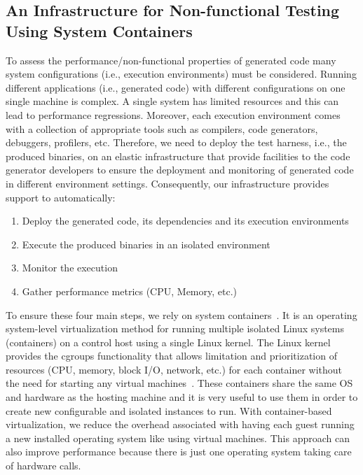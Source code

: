 \subsection{An Infrastructure for Non-functional Testing Using System Containers}
To assess the performance/non-functional properties of generated code many system configurations (i.e., execution environments) must be considered. Running different applications (i.e., generated code) with different configurations on one single machine is complex. 
A single system has limited resources and this can lead to performance regressions. Moreover, each execution environment comes with a collection of appropriate tools such as compilers, code generators, debuggers, profilers, etc. Therefore, we need to deploy the test harness, i.e., the produced binaries, on an elastic infrastructure that provide facilities to the code generator developers to ensure the deployment and monitoring of generated code in different environment settings. 
Consequently, our infrastructure provides support to automatically:
\begin{enumerate}
	\item Deploy the generated code, its dependencies and its  execution environments
	\item Execute the produced binaries in an isolated environment 
	\item Monitor the execution 
	\item Gather performance metrics (CPU, Memory, etc.)
\end{enumerate}

To ensure these four main steps, we rely on system containers~\cite{soltesz2007container}. 
It is an operating system-level virtualization method for running multiple isolated Linux systems (containers) on a control host using a single Linux kernel. 
The Linux kernel provides the cgroups functionality that allows limitation and prioritization of resources (CPU, memory, block I/O, network, etc.) for each container without the need for starting any virtual machines~\cite{luotowards}.
These containers share the same OS and hardware as the hosting machine and it is very useful to use them in order to create new configurable and isolated instances to run. 
With container-based virtualization, we reduce the overhead associated with having each guest running a new installed operating system like using virtual machines. This approach can also improve performance because there is just one operating system taking care of hardware calls.



